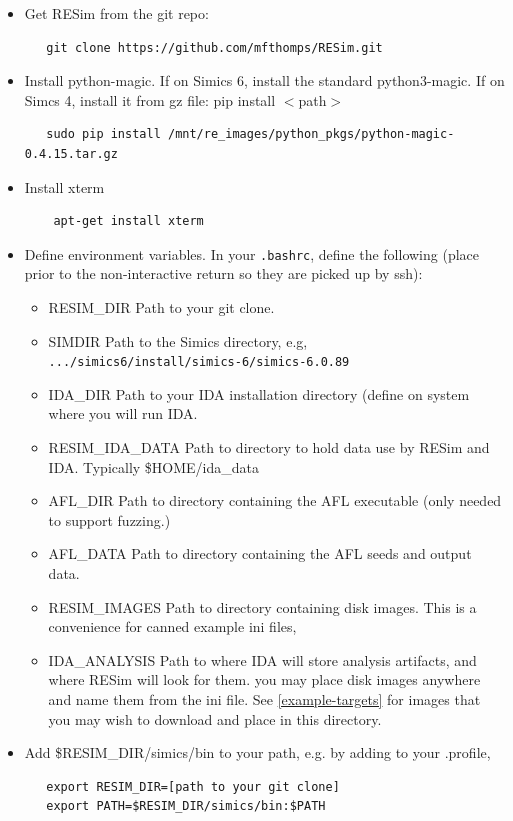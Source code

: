 \documentclass[titlepage]{article}
\begin{document}
\begin{itemize}
\item Get RESim from the git repo:
\begin{verbatim}
   git clone https://github.com/mfthomps/RESim.git
\end{verbatim}
\item Install python-magic.  If on Simics 6, install the standard python3-magic.  If on Simcs 4, install it from gz file:  pip install $<$path$>$
\begin{verbatim}
   sudo pip install /mnt/re_images/python_pkgs/python-magic-0.4.15.tar.gz
\end{verbatim}
\item Install xterm
\begin{verbatim}
    apt-get install xterm
\end{verbatim}
\item Define environment variables.  In your {\tt .bashrc}, define the following (place prior to the 
non-interactive return so they are picked up by ssh):
\begin{itemize}
\item RESIM\_DIR  Path to your git clone.
\item SIMDIR  Path to the Simics directory, e.g, {\tt .../simics6/install/simics-6/simics-6.0.89}
\item IDA\_DIR Path to your IDA installation directory (define on system where you will run IDA.
\item RESIM\_IDA\_DATA Path to directory to hold data use by RESim and IDA.  Typically \$HOME/ida\_data
\item AFL\_DIR Path to directory containing the AFL executable (only needed to support fuzzing.)
\item AFL\_DATA Path to directory containing the AFL seeds and output data.
\item RESIM\_IMAGES Path to directory containing disk images.  This is a convenience for canned example ini files,
\item IDA\_ANALYSIS Path to where IDA will store analysis artifacts, and where RESim will look for them.
you may place disk images anywhere and name them from the ini file.  See \ref{example-targets} for images that you may
wish to download and place in this directory.
\end{itemize}
\item Add \$RESIM\_DIR/simics/bin to your path, e.g. by adding to your .profile,
\begin{verbatim}
   export RESIM_DIR=[path to your git clone]
   export PATH=$RESIM_DIR/simics/bin:$PATH
\end{verbatim}

\end{itemize}
\end{document}
